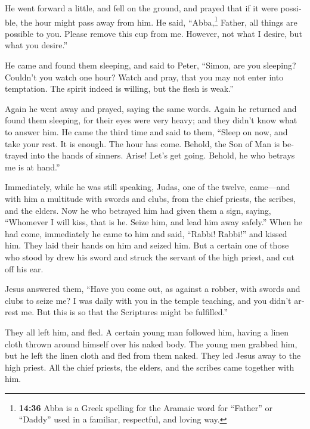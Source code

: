 \begin{paracol}{2}
\begin{otherlanguage}{english}
 He went forward a little, and fell on the ground, and
prayed that if it were possible, the hour might pass away from him.
 He said, ``Abba,\footnote{\textbf{14:36} Abba is a Greek
  spelling for the Aramaic word for ``Father'' or ``Daddy'' used in a
  familiar, respectful, and loving way.} Father, all things are possible
to you. Please remove this cup from me. However, not what I desire, but
what you desire.''

 He came and found them sleeping, and said to Peter,
``Simon, are you sleeping? Couldn't you watch one hour? 
Watch and pray, that you may not enter into temptation. The spirit
indeed is willing, but the flesh is weak.''

 Again he went away and prayed, saying the same words.
 Again he returned and found them sleeping, for their
eyes were very heavy; and they didn't know what to answer him.
 He came the third time and said to them, ``Sleep on now,
and take your rest. It is enough. The hour has come. Behold, the Son of
Man is betrayed into the hands of sinners.  Arise! Let's
get going. Behold, he who betrays me is at hand.''

 Immediately, while he was still speaking, Judas, one of
the twelve, came---and with him a multitude with swords and clubs, from
the chief priests, the scribes, and the elders.  Now he
who betrayed him had given them a sign, saying, ``Whomever I will kiss,
that is he. Seize him, and lead him away safely.''  When
he had come, immediately he came to him and said, ``Rabbi! Rabbi!'' and
kissed him.  They laid their hands on him and seized him.
 But a certain one of those who stood by drew his sword
and struck the servant of the high priest, and cut off his ear.

 Jesus answered them, ``Have you come out, as against a
robber, with swords and clubs to seize me?  I was daily
with you in the temple teaching, and you didn't arrest me. But this is
so that the Scriptures might be fulfilled.''

 They all left him, and fled.  A certain
young man followed him, having a linen cloth thrown around himself over
his naked body. The young men grabbed him,  but he left
the linen cloth and fled from them naked.  They led Jesus
away to the high priest. All the chief priests, the elders, and the
scribes came together with him.


\end{otherlanguage}
\end{paracol}
